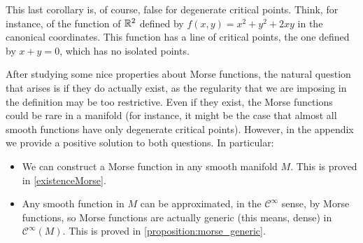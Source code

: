 \begin{rmrk}
This last corollary is, of course, false for degenerate critical points. Think, for instance, of the function of $\mathbb{R}^2$ defined by $f(x,y) = x^2+y^2+2xy$ in the canonical coordinates. This function has a line of critical points, the one defined by $x + y = 0$, which has no isolated points.
\end{rmrk}

After studying some nice properties about Morse functions, the natural question that arises is if they do actually exist, as the regularity that we are imposing in the definition may be too restrictive. Even if they exist, the Morse functions could be rare in a manifold (for instance, it might be the case that almost all smooth functions have only degenerate critical points). However, in the appendix we provide a positive solution to both questions. In particular:
\begin{itemize}
	\item We can construct a Morse function in any smooth manifold $M$. This is proved in \ref{existenceMorse}.
	\item Any smooth function in $M$ can be approximated, in the $\mathcal{C}^{\infty}$ sense, by Morse functions, so Morse functions are actually generic (this means, dense) in $\mathcal{C}^{\infty}(M)$. This is proved in \ref{proposition:morse_generic}.
\end{itemize}
